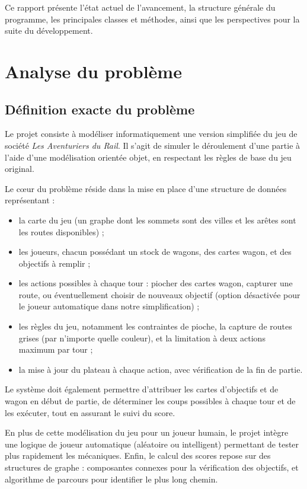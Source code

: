 \documentclass[a4paper,12pt]{report}
\begin{document}
Ce rapport présente l’état actuel de l’avancement, la structure générale du programme, les principales classes et méthodes,
ainsi que les perspectives pour la suite du développement.

\chapter{Analyse du problème}

\section{Définition exacte du problème}

Le projet consiste à modéliser informatiquement une version simplifiée du jeu de société \textit{Les Aventuriers du Rail}.
Il s'agit de simuler le déroulement d'une partie à l'aide d'une modélisation orientée objet, en respectant les règles de base du jeu original.

Le cœur du problème réside dans la mise en place d'une structure de données représentant :
\begin{itemize}
    \item la carte du jeu (un graphe dont les sommets sont des villes et les arêtes sont les routes disponibles) ;
    \item les joueurs, chacun possédant un stock de wagons, des cartes wagon, et des objectifs à remplir ;
    \item les actions possibles à chaque tour : piocher des cartes wagon, capturer une route, ou éventuellement choisir
    de nouveaux objectif (option désactivée pour le joueur automatique dans notre simplification) ;
    \item les règles du jeu, notamment les contraintes de pioche, la capture de routes grises
    (par n'importe quelle couleur), et la limitation à deux actions maximum par tour ;
    \item la mise à jour du plateau à chaque action, avec vérification de la fin de partie.
\end{itemize}

Le système doit également permettre d’attribuer les cartes d’objectifs et de wagon en début de partie,
de déterminer les coups possibles à chaque tour et de les exécuter, tout en assurant le suivi du score.

En plus de cette modélisation du jeu pour un joueur humain, le projet intègre une logique de joueur automatique
(aléatoire ou intelligent) permettant de tester plus rapidement les mécaniques.
Enfin, le calcul des scores repose sur des structures de graphe : composantes connexes pour la vérification des objectifs,
et algorithme de parcours pour identifier le plus long chemin.
\end{document}
